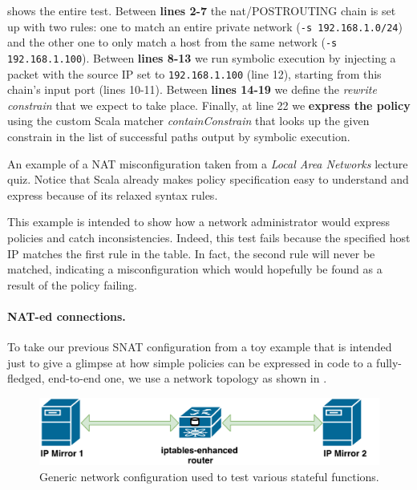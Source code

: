  shows the entire test.  Between
\textbf{lines 2-7} the nat/POSTROUTING chain is set up with two rules: one to
match an entire private network (\lstinline{-s 192.168.1.0/24}) and the other
one to only match a host from the same network (\lstinline{-s 192.168.1.100}).
Between \textbf{lines 8-13} we run symbolic execution by injecting a packet
with the source IP set to \lstinline{192.168.1.100} (line 12), starting from
this chain's input port (lines 10-11).  Between \textbf{lines 14-19} we define
the \emph{rewrite constrain} that we expect to take place.  Finally, at line 22
we \textbf{express the policy} using the custom Scala matcher
\emph{containConstrain} that looks up the given constrain in the list of
successful paths output by symbolic execution.

\begin{listing}[H]
  \caption{An example of a NAT misconfiguration taken from a \emph{Local Area
  Networks} lecture quiz.  Notice that Scala already makes policy specification
  easy to understand and express because of its relaxed syntax rules.}
  \label{lst:unreachable-rule}
\end{listing}

This example is intended to show how a network administrator would express
policies and catch inconsistencies.  Indeed, this test fails because the
specified host IP matches the first rule in the table.  In fact, the second
rule will never be matched, indicating a misconfiguration which would hopefully
be found as a result of the policy failing.

\paragraph{NAT-ed connections.}
To take our previous SNAT configuration from a toy example that is intended
just to give a glimpse at how simple policies can be expressed in code to a
fully-fledged, end-to-end one, we use a network topology as shown in
.

\begin{figure}[h]
  \centering
  \captionsetup{justification=centering}
  \includegraphics[scale=0.5]{assets/img/source-nating}
  \caption{Generic network configuration used to test various stateful
  functions.}
  \label{fig:source-nating}
\end{figure}

